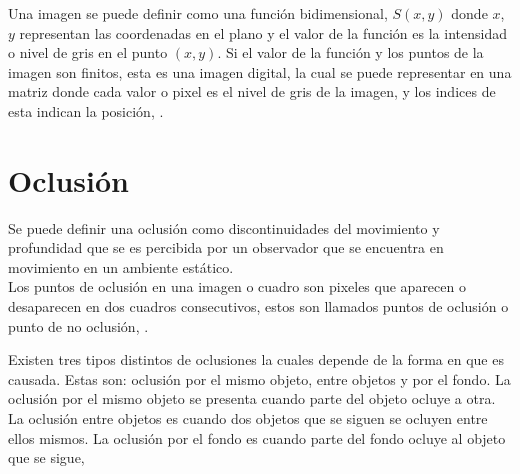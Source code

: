 Una imagen se puede definir como una función bidimensional, $S(x,y)$ donde $x$, $y$ representan las coordenadas en el plano y el valor de la función es la intensidad o nivel de gris en el punto $(x,y)$. 
Si el valor de la función y los puntos de la imagen son finitos, esta es una imagen digital, la cual se puede representar en una matriz donde cada valor o pixel es el nivel de gris de la imagen, y los indices de esta indican la posición, \citep{Gonzalez2002}. 



\section{Oclusión}\label{OclusionDef} 

Se puede definir una oclusión como discontinuidades del movimiento y profundidad que se es percibida por un observador que se encuentra en movimiento en un ambiente estático.\\
Los puntos de oclusión en una imagen o cuadro son pixeles que aparecen o desaparecen en dos cuadros consecutivos, estos son llamados puntos de oclusión o punto de no oclusión, \citep{Silva2001}.  

Existen tres tipos distintos de oclusiones la cuales depende de la forma en que es causada. Estas son: oclusión por el mismo objeto, entre objetos y por el fondo. La oclusión por el mismo objeto se presenta cuando parte del objeto ocluye a otra. La oclusión entre objetos es cuando dos objetos que se siguen se ocluyen entre ellos mismos. La oclusión por el fondo es cuando parte del fondo ocluye al objeto que se sigue, \citep{YilmazA.JavedO.andShah2006}


\newpage
